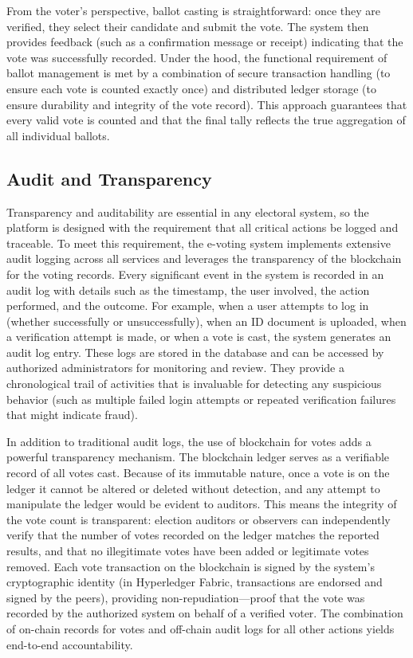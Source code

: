 \documentclass[a4paper,10pt]{report}
\begin{document}
From the voter’s perspective, ballot casting is straightforward: once they are verified, they select their candidate and submit the vote. The system then provides feedback (such as a confirmation message or receipt) indicating that the vote was successfully recorded. Under the hood, the functional requirement of ballot management is met by a combination of secure transaction handling (to ensure each vote is counted exactly once) and distributed ledger storage (to ensure durability and integrity of the vote record). This approach guarantees that every valid vote is counted and that the final tally reflects the true aggregation of all individual ballots.

\subsection{Audit and Transparency}
Transparency and auditability are essential in any electoral system, so the platform is designed with the requirement that all critical actions be logged and traceable. To meet this requirement, the e-voting system implements extensive audit logging across all services and leverages the transparency of the blockchain for the voting records. Every significant event in the system is recorded in an audit log with details such as the timestamp, the user involved, the action performed, and the outcome. For example, when a user attempts to log in (whether successfully or unsuccessfully), when an ID document is uploaded, when a verification attempt is made, or when a vote is cast, the system generates an audit log entry. These logs are stored in the database and can be accessed by authorized administrators for monitoring and review. They provide a chronological trail of activities that is invaluable for detecting any suspicious behavior (such as multiple failed login attempts or repeated verification failures that might indicate fraud).

In addition to traditional audit logs, the use of blockchain for votes adds a powerful transparency mechanism. The blockchain ledger serves as a verifiable record of all votes cast. Because of its immutable nature, once a vote is on the ledger it cannot be altered or deleted without detection, and any attempt to manipulate the ledger would be evident to auditors. This means the integrity of the vote count is transparent: election auditors or observers can independently verify that the number of votes recorded on the ledger matches the reported results, and that no illegitimate votes have been added or legitimate votes removed. Each vote transaction on the blockchain is signed by the system’s cryptographic identity (in Hyperledger Fabric, transactions are endorsed and signed by the peers), providing non-repudiation—proof that the vote was recorded by the authorized system on behalf of a verified voter. The combination of on-chain records for votes and off-chain audit logs for all other actions yields end-to-end accountability.
\end{document}
